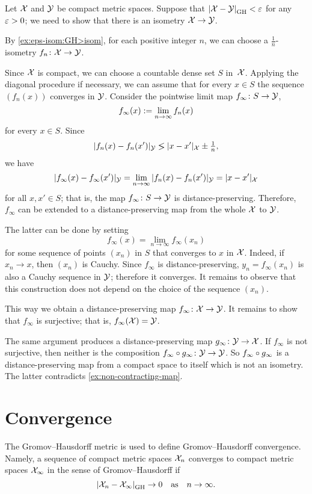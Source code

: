\label{page:GH-2-proof}
Let $\mathcal{X}$ and $\mathcal{Y}$ be compact metric spaces.
Suppose that $\dist{\spc{X}}{\spc{Y}}{\GH}<\eps$ for any $\varepsilon>0$;
we need to show that there is an isometry $\mathcal{X}\to\mathcal{Y}$.

By \ref{ex:eps-isom:GH>isom}, for each positive integer $n$, we can choose a $\tfrac1n$-isometry $f_n\colon\mathcal{X}\to\mathcal{Y}$.

Since $\mathcal{X}$ is compact, 
we can choose a countable dense set
$S$ in~$\mathcal{X}$.
Applying the diagonal procedure if necessary, we can assume that for every $x \in S$ the sequence $(f_n(x))$ 
converges in $\mathcal{Y}$. 
Consider the pointwise limit map  $f_\infty \colon S \to \mathcal{Y}$,
 $$f_\infty(x) \mathrel{:=} \lim_{n\to\infty} f_n (x)$$ for every $x \in S$. 
Since $$|f_n (x)- f_n (x')|_{\spc{Y}}\lg |x- x'|_\spc{X} \pm\tfrac1n,$$ 
we have 
$$|f_\infty(x)-f_\infty (x')|_{\mathcal{Y}} 
= \lim_{n\to\infty} |f_n(x)-f_n (x')|_{\mathcal{Y}} 
= |x -x'|_{\mathcal{X}}$$ for all
$x, x' \in S$; 
that is, the map $f_\infty\colon S\to \mathcal{Y}$ is distance-preserving. 
Therefore, $f_\infty$ can be extended to a distance-preserving map from the whole $\mathcal{X}$ to $\mathcal{Y}$.

The latter can be done by setting 
$$f_\infty(x)=\lim_{n\to\infty} f_\infty(x_n)$$ 
for some sequence of points $(x_n)$ in $S$
that converges to $x$ in $\mathcal{X}$.
Indeed, if $x_n\to x$, then $(x_n)$ is Cauchy.
Since $f_\infty$ is distance-preserving, $y_n=f_\infty(x_n)$ is also a Cauchy sequence in $\mathcal{Y}$;
therefore it converges.
It remains to observe that this construction does not depend on the choice of the sequence $(x_n)$.

This way we obtain a distance-preserving map $f_\infty\colon\mathcal{X}\to \mathcal{Y}$. 
It remains to show that $f_\infty$ is surjective; that is, $f_\infty(\mathcal{X})=\mathcal{Y}$.

The same argument produces a distance-preserving map $g_\infty\:\spc{Y}\z\to \spc{X}$.
If $f_\infty$ is not surjective, then neither is the composition $f_\infty\z\circ g_\infty\:\spc{Y}\to \spc{Y}$.
So $f_\infty \z\circ g_\infty$ is a distance-preserving map from a compact space to itself which is not an isometry.
The latter contradicts \ref{ex:non-contracting-map}. 
\qeds

\section{Convergence}

The Gromov--Hausdorff metric is used to define Gromov--Hausdorff convergence.
Namely, a sequence of compact metric spaces $\mathcal{X}_n$ converges to compact metric spaces $\mathcal{X}_\infty$ in the sense of Gromov--Hausdorff if 
\[\dist{\spc{X}_n}{\spc{X}_\infty}{\GH}\to 0\quad\text{as}\quad n\to\infty.\]

